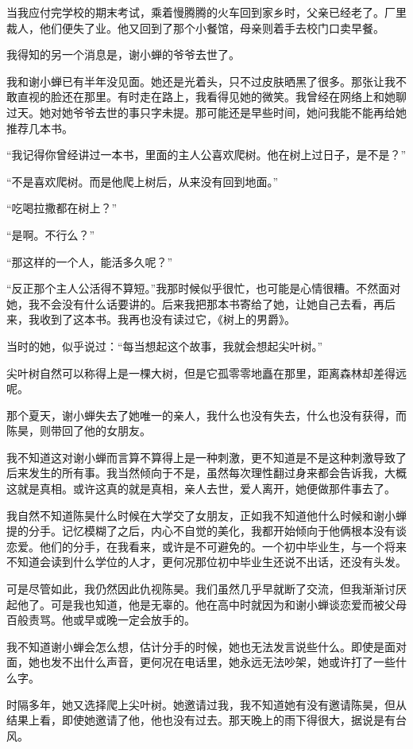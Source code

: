 \documentclass[lang=cn]{elegantpaper}
\begin{document}
当我应付完学校的期末考试，乘着慢腾腾的火车回到家乡时，父亲已经老了。厂里裁人，他们便失了业。他又回到了那个小餐馆，母亲则着手去校门口卖早餐。

我得知的另一个消息是，谢小蝉的爷爷去世了。

我和谢小蝉已有半年没见面。她还是光着头，只不过皮肤晒黑了很多。那张让我不敢直视的脸还在那里。有时走在路上，我看得见她的微笑。我曾经在网络上和她聊过天。她对她爷爷去世的事只字未提。那可能还是早些时间，她问我能不能再给她推荐几本书。

“我记得你曾经讲过一本书，里面的主人公喜欢爬树。他在树上过日子，是不是？”

“不是喜欢爬树。而是他爬上树后，从来没有回到地面。”

“吃喝拉撒都在树上？”

“是啊。不行么？”

“那这样的一个人，能活多久呢？”

“反正那个主人公活得不算短。”我那时候似乎很忙，也可能是心情很糟。不然面对她，我不会没有什么话要讲的。后来我把那本书寄给了她，让她自己去看，再后来，我收到了这本书。我再也没有读过它，《树上的男爵》。

当时的她，似乎说过：“每当想起这个故事，我就会想起尖叶树。”

尖叶树自然可以称得上是一棵大树，但是它孤零零地矗在那里，距离森林却差得远呢。

那个夏天，谢小蝉失去了她唯一的亲人，我什么也没有失去，什么也没有获得，而陈昊，则带回了他的女朋友。

我不知道这对谢小蝉而言算不算得上是一种刺激，更不知道是不是这种刺激导致了后来发生的所有事。我当然倾向于不是，虽然每次理性翻过身来都会告诉我，大概这就是真相。或许这真的就是真相，亲人去世，爱人离开，她便做那件事去了。

我自然不知道陈昊什么时候在大学交了女朋友，正如我不知道他什么时候和谢小蝉提的分手。记忆模糊了之后，内心不自觉的美化，我都开始倾向于他俩根本没有谈恋爱。他们的分手，在我看来，或许是不可避免的。一个初中毕业生，与一个将来不知道会读到什么学位的人才，更何况那位初中毕业生还说不出话，还没有头发。

可是尽管如此，我仍然因此仇视陈昊。我们虽然几乎早就断了交流，但我渐渐讨厌起他了。可是我也知道，他是无辜的。他在高中时就因为和谢小蝉谈恋爱而被父母百般责骂。他或早或晚一定会放手的。

我不知道谢小蝉会怎么想，估计分手的时候，她也无法发言说些什么。即使是面对面，她也发不出什么声音，更何况在电话里，她永远无法吵架，她或许打了一些什么字。

时隔多年，她又选择爬上尖叶树。她邀请过我，我不知道她有没有邀请陈昊，但从结果上看，即使她邀请了他，他也没有过去。那天晚上的雨下得很大，据说是有台风。
\end{document}
